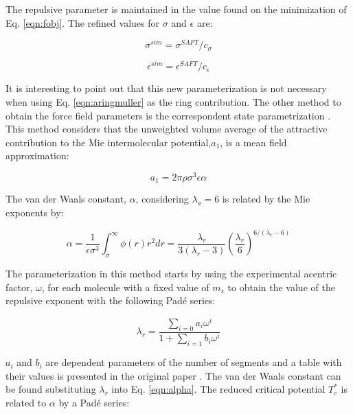 The repulsive parameter is maintained in the value found on the minimization of Eq. \eqref{eqn:fobj}. The refined values for $\sigma$ and $\epsilon$ are:

\begin{equation}
\sigma^{sim} = \sigma^{SAFT}/c_{\sigma}
\label{eqn:simsigma}
\end{equation}

\begin{equation}
\epsilon^{sim} = \epsilon^{SAFT}/c_{\epsilon}
\label{eqn:simeps}
\end{equation}

It is interesting to point out that this new parameterization is not necessary when using Eq. \eqref{eqn:aringmuller} as the ring contribution. The other method to obtain the force field parameters is the correspondent state parametrization \cite{mejia2014}. This method considers that the unweighted volume average of the attractive contribution to the Mie intermolecular potential,$a_{1}$, is a mean field approximation:

\begin{equation}
a_{1} = 2\pi\rho\sigma^{3}\epsilon\alpha
\label{eqn:a1corres}
\end{equation}

The van der Waals constant, $\alpha$, considering $ \lambda_{a} = 6$ is related by the Mie exponents by:

\begin{equation}
\alpha = \frac{1}{\epsilon\sigma^{3	}} \int_{\sigma}^{\infty} \phi(r)r^{2}dr = \frac{\lambda_{r}}{3(\lambda_{r}-3)}\left(\frac{\lambda_r}{6}\right)^{6/(\lambda_{r} - 6)}  
\label{eqn:alpha}
\end{equation}

The parameterization in this method starts by using the experimental acentric factor, $\omega$, for each molecule with a fixed value of $ m_{s}$ to obtain the value of the repulsive exponent with the following Padé series:

\begin{equation}
\lambda_{r} = \frac{\sum_{i=0} a_{i}\omega^{i}}{1+\sum_{i=1} b_{i}\omega^{i}}   
\label{eqn:lambdaco}
\end{equation}

$a_{i}$ and $b_{i}$ are dependent parameters of the number of segments and a table with their values is presented in the original paper \cite{mejia2014}. The van der Waals constant can be found substituting $\lambda_{r}$ into Eq. \eqref{eqn:alpha}. The reduced critical potential $T_{c}^{*}$ is related to $\alpha$ by a Padé series: 

